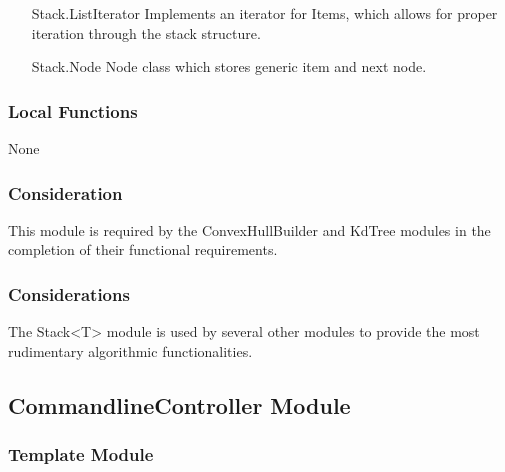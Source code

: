 \documentclass[12pt]{article}
\begin{document}
                \begin{itemize}
                    \item[Stack.ListIterator] Implements an iterator for Items, which allows for proper iteration through the stack structure.
                    \item[Stack.Node] Node class which stores generic item and next node.
                \end{itemize}
                
                \subsubsection* {Local Functions}
                
                None
                    
                \subsubsection*{Consideration} This module is required by the ConvexHullBuilder and KdTree modules in the completion of their functional requirements.
                    
                \subsubsection*{Considerations}    
                
                The Stack<T> module is used by several other modules to provide the most rudimentary algorithmic functionalities.
                
        \newpage
        
           
           \newpage
                 \subsection* {CommandlineController Module}
                
                \subsubsection*{Template Module}
                
\end{document}
